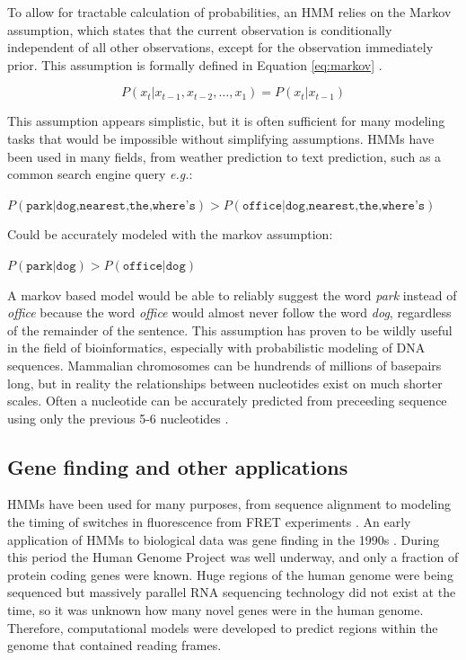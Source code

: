 To allow for tractable calculation of probabilities, an HMM relies on the Markov assumption, which states that the current observation is conditionally independent of all other observations, except for the observation immediately prior. This assumption is formally defined in Equation \ref{eq:markov} \cite{Rabiner1989ARecognition}.

\begin{equation}
    P(x_t|x_{t-1},x_{t-2},\dots,x_1) = P(x_t | x_{t-1})
\label{eq:markov}
\end{equation}

This assumption appears simplistic, but it is often sufficient for many modeling tasks that would be impossible without simplifying assumptions. HMMs have been used in many fields, from weather prediction to text prediction, such as a common search engine query \emph{e.g.}: 

\begin{center}
    $P(\texttt{park} | \texttt{dog,nearest,the,where's}) > P(\texttt{office} | \texttt{dog,nearest,the,where's}) $
\end{center}

Could be accurately modeled with the markov assumption:

\begin{center}
    $P(\texttt{park} | \texttt{dog}) > P(\texttt{office} | \texttt{dog}) $
\end{center}

A markov based model would be able to reliably suggest the word \emph{park} instead of \emph{office} because the word \emph{office} would almost never follow the word \emph{dog}, regardless of the remainder of the sentence. This assumption has proven to be wildly useful in the field of bioinformatics, especially with probabilistic modeling of DNA sequences. Mammalian chromosomes can be hundrends of millions of basepairs long, but in reality the relationships between nucleotides exist on much shorter scales. Often a nucleotide can be accurately predicted from preceeding sequence using only the previous 5-6 nucleotides \cite{Burge1997PredictionDNA}.

\subsection{Gene finding and other applications}
HMMs have been used for many purposes, from sequence alignment \cite{Wheeler2013Nhmmer:HMMs} to modeling the timing of switches in fluorescence from FRET experiments \cite{Sgouralis2017AnAnalysis}. An early application of HMMs to biological data was gene finding in the 1990s \cite{Burge1997PredictionDNA}. During this period the Human Genome Project was well underway, and only a fraction of protein coding genes were known. Huge regions of the human genome were being sequenced but massively parallel RNA sequencing technology did not exist at the time, so it was unknown how many novel genes were in the human genome. Therefore, computational models were developed to predict regions within the genome that contained reading frames. 

